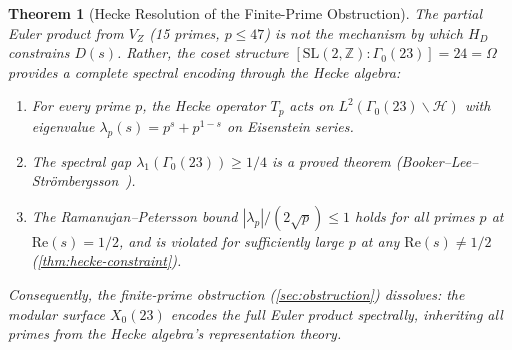 \documentclass[11pt,a4paper]{article}
\theoremstyle{plain}
\newtheorem{theorem}{Theorem}[section]
\theoremstyle{remark}
\renewcommand{\Omega}{\varOmega}
\newcommand{\Z}{\mathbb{Z}}
\newcommand{\HH}{\mathcal{H}}
\begin{document}
\begin{theorem}[Hecke Resolution of the Finite-Prime Obstruction]
\label{thm:hecke-resolution}
The partial Euler product from $V_Z$ (15 primes, $p \leq 47$) is not the
mechanism by which $H_D$ constrains $D(s)$.  Rather, the coset structure
$[\mathrm{SL}(2,\Z):\Gamma_0(23)] = 24 = \Omega$ provides a complete
spectral encoding through the Hecke algebra:
\begin{enumerate}[nosep]
  \item For every prime $p$, the Hecke operator $T_p$ acts on
        $L^2(\Gamma_0(23)\backslash\HH)$ with eigenvalue
        $\lambda_p(s) = p^s + p^{1-s}$ on Eisenstein series.
  \item The spectral gap $\lambda_1(\Gamma_0(23)) \geq 1/4$ is a proved
        theorem \textup{(Booker--Lee--Str\"ombergsson~\cite{booker-lee-strombergsson2020})}.
  \item The Ramanujan--Petersson bound $|\lambda_p|/(2\sqrt{p}) \leq 1$ holds
        for all primes $p$ at $\mathrm{Re}(s) = 1/2$, and is violated for
        sufficiently large $p$ at any $\mathrm{Re}(s) \neq 1/2$
        \textup{(\cref{thm:hecke-constraint})}.
\end{enumerate}
Consequently, the finite-prime obstruction (\cref{sec:obstruction}) dissolves:
the modular surface $X_0(23)$ encodes the full Euler product spectrally,
inheriting all primes from the Hecke algebra's representation theory.
\end{theorem}
\end{document}

